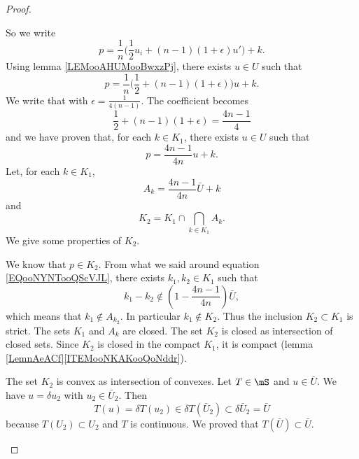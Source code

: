 \begin{proof}
\begin{subproof}
        So we write
        \begin{equation}
            p=\frac{1}{ n }\big( \frac{ 1 }{2}u_i +(n-1)(1+\epsilon)u' \big)+k.
        \end{equation}
        Using lemma \ref{LEMooAHUMooBwxzPj}, there exists \( u\in U\) such that
        \begin{equation}
            p=\frac{1}{ n }\big( \frac{ 1 }{2}+(n-1)(1+\epsilon) \big)u+k.
        \end{equation}
        We write that with \( \epsilon=\frac{1}{ 4(n-1) }\). The coefficient becomes
        \begin{equation}
            \frac{ 1 }{2}+(n-1)(1+\epsilon)=\frac{ 4n-1 }{ 4 }
        \end{equation}
        and we have proven that, for each \( k\in K_1\), there exists \( u\in U\) such that
        \begin{equation}
            p=\frac{ 4n-1 }{ 4n }u+k.
        \end{equation}
    \spitem[Definition of \( K_2\)]
        Let, for each \( k\in K_1\),
        \begin{equation}
            A_k=\frac{ 4n-1 }{ 4n }\bar U+k
        \end{equation}
        and
        \begin{equation}
            K_2=K_1\cap\bigcap_{k\in K_1}A_k.
        \end{equation}
        We give some properties of \( K_2\).
        \begin{subproof}
        We know that \( p\in K_2\).
    \spitem[\( K_2\subsetneq K_1\)]
        From what we said around equation \eqref{EQooNYNTooQScVJL}, there exists \( k_1,k_2\in K_1\) such that
        \begin{equation}
            k_1-k_2\notin\left( 1-\frac{ 4n-1 }{ 4n } \right)\bar U,
        \end{equation}
        which means that \( k_1\notin A_{k_2}\). In particular \( k_1\notin K_2\). Thus the inclusion \( K_2\subset K_1\) is strict.
        The sets \( K_1\) and \( A_k\) are closed. The set \( K_2\) is closed as intersection of closed sets. Since \( K_2\) is closed in the compact \( K_1\), it is compact (lemma \ref{LemnAeACf}\ref{ITEMooNKAKooQoNddr}).

        The set \( K_2\) is convex as intersection of convexes.
    \spitem[\( \mS(K_2)\subset K_2\)]
        Let \( T\in \mS\) and \( u\in\bar U\). We have \( u=\delta u_2\) with \( u_2\in\bar U_2\). Then
        \begin{equation}
            T(u)=\delta T(u_2)\in \delta T(\bar U_2)\subset \delta\bar U_2=\bar U
        \end{equation}
        because \( T(U_2)\subset U_2\) and \( T\) is continuous. We proved that \( T(\bar U)\subset \bar U\).


\end{subproof}
\end{subproof}
\end{proof}
